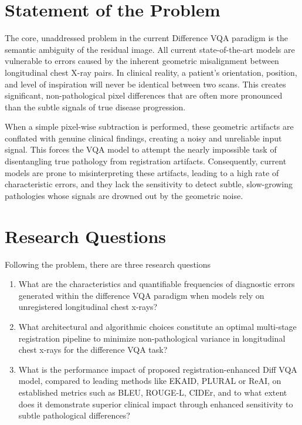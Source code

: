 \section{Statement of the Problem}

The core, unaddressed problem in the current Difference VQA paradigm is the semantic ambiguity of the residual image. All current state-of-the-art models are vulnerable to errors caused by the inherent geometric misalignment between longitudinal chest X-ray pairs. In clinical reality, a patient's orientation, position, and level of inspiration will never be identical between two scans. This creates significant, non-pathological pixel differences that are often more pronounced than the subtle signals of true disease progression.

When a simple pixel-wise subtraction is performed, these geometric artifacts are conflated with genuine clinical findings, creating a noisy and unreliable input signal. This forces the VQA model to attempt the nearly impossible task of disentangling true pathology from registration artifacts. Consequently, current models are prone to misinterpreting these artifacts, leading to a high rate of characteristic errors, and they lack the sensitivity to detect subtle, slow-growing pathologies whose signals are drowned out by the geometric noise.

\section{Research Questions}
Following the problem, there are three research questions
\begin{enumerate}
    \item What are the characteristics and quantifiable frequencies of diagnostic errors generated within the difference VQA paradigm when models rely on unregistered longitudinal chest x-rays?
    
    \item What architectural and algorithmic choices constitute an optimal multi-stage registration pipeline to  minimize non-pathological variance in longitudinal chest x-rays for the difference VQA task?
    
    \item What is the performance impact of proposed registration-enhanced Diff VQA model, compared to leading methods like EKAID, PLURAL or ReAI, on established metrics such as BLEU, ROUGE-L, CIDEr, and to what extent does it demonstrate superior clinical impact through enhanced sensitivity to subtle pathological differences?
\end{enumerate}

